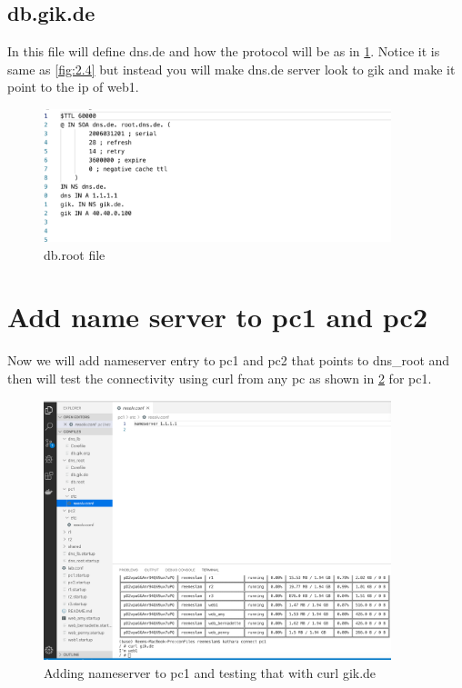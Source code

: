 \subsection{db.gik.de}

In this file will define dns.de  and how the protocol will be as in \ref{fig:2.5}. Notice it is same as \ref{fig:2.4} but instead you will make dns.de server look to gik and make it point to the ip of web1.

 \begin{figure}[H]
\centering
  \includegraphics[width=0.9\textwidth]{Images/dpGik.png}
  \caption{db.root file}
  \label{fig:2.5}
\end{figure}

\section{Add name server to pc1 and pc2}
Now we will add nameserver entry to pc1 and pc2 that points to dns\_root and then will test the connectivity using curl from any pc as shown in \ref{fig:2.6} for pc1.
\begin{figure}[H]
\centering
  \includegraphics[width=0.9\textwidth]{Images/nameServer.png}
  \caption{Adding nameserver to pc1 and testing that with curl gik.de}
  \label{fig:2.6}
\end{figure}

